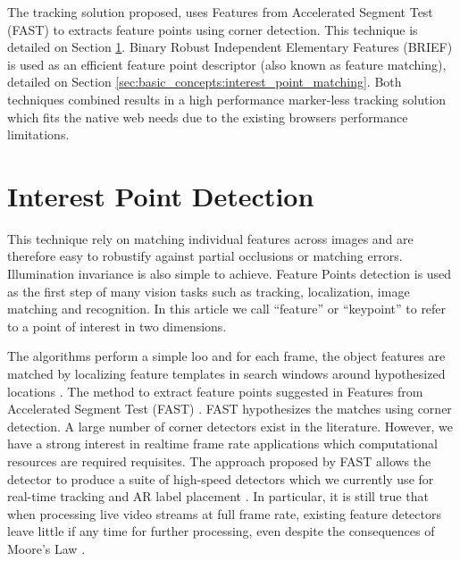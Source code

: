 The tracking solution proposed, uses Features from Accelerated Segment Test (FAST) \cite{Rosten2010} to extracts feature points using corner detection. This technique is detailed on Section \ref{sec:basic_concepts:interest_point_detection}. Binary Robust Independent Elementary Features (BRIEF) \cite{Calonder2010} is used as an efficient feature point descriptor (also known as feature matching), detailed on Section \ref{sec:basic_concepts:interest_point_matching}. Both techniques combined results in a high performance marker-less tracking solution which fits the native web needs due to the existing browsers performance limitations.



\section{Interest Point Detection} %
\label{sec:basic_concepts:interest_point_detection}

This technique rely on matching individual features across images and are therefore easy to robustify against partial occlusions or matching errors. Illumination invariance is also simple to achieve. Feature Points detection is used as the first step of many vision tasks such as tracking, localization, image matching and recognition. In this article we call ``feature'' or ``keypoint'' to refer to a point of interest in two dimensions.

The algorithms perform a simple loo and for each frame, the object features are matched by localizing feature templates in search windows around hypothesized locations \cite{Lepetit2005}. The method to extract feature points suggested in Features from Accelerated Segment Test (FAST) \cite{Rosten2010}. FAST hypothesizes the matches using corner detection. A large number of corner detectors exist in the literature. However, we have a strong interest in realtime frame rate applications which computational resources are required requisites. The approach proposed by FAST allows the detector to produce a suite of high-speed detectors which we currently use for real-time tracking and AR label placement \cite{Calonder2010}. In particular, it is still true that when processing live video streams at full frame rate, existing feature detectors leave little if any time for further processing, even despite the consequences of Moore’s Law \cite{Rosten2010}.

